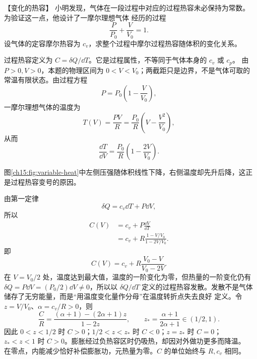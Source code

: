 {\begin{origexamplebox}{【变化的热容】}\label{ch15:ex:s29-20-3}
小明发现，气体在一段过程中对应的过程热容未必保持为常数。为验证这一点，他设计了一摩尔理想气体
经历的过程
\begin{equation*}
  \frac{P}{P_0}+\frac{V}{V_0}=1.
\end{equation*}
设气体的定容摩尔热容为 $c_v$，求整个过程中摩尔过程热容随体积的变化关系。

\ThQVariableCapacity
\end{origexamplebox}\par\nopagebreak[4]

\par\nopagebreak[4]\begin{xesolution}
过程热容定义为 $C=\delta Q/\dd T$。它是过程属性，不等同于气体本身的 $c_v$ 或 $c_p$。
由 $P>0,V>0$，本题的物理区间为 $0<V<V_0$；两截距只是边界，不是气体可取的常温有限状态。由过程方程
\begin{equation*}
  P=P_0\left(1-\frac{V}{V_0}\right),
\end{equation*}
一摩尔理想气体的温度为
\begin{equation*}
  T(V)=\frac{PV}{R}
  =\frac{P_0}{R}\left(V-\frac{V^2}{V_0}\right),
\end{equation*}
从而
\begin{equation*}
  \frac{\dd T}{\dd V}=\frac{P_0}{R}\left(1-\frac{2V}{V_0}\right).
\end{equation*}

\par\noindent\begin{minipage}{\linewidth}
\variableHeatCapacityDiagram
{}\label{ch15:fig:variable-heat}
\end{minipage}\par\medskip
图\ref{ch15:fig:variable-heat}中左侧压强随体积线性下降，右侧温度却先升后降，这正是过程热容变号的原因。

由第一定律
\begin{equation*}
  \delta Q=c_v\dd T+P\dd V,
\end{equation*}
所以
\begin{align*}
  C(V)
  &=c_v+P\frac{\dd V}{\dd T}\\
  &=c_v+R\frac{1-V/V_0}{1-2V/V_0}.
\end{align*}
即
\begin{equation}
  \boxed{C(V)=c_v+R\frac{V_0-V}{V_0-2V}}.
\end{equation}
在 $V=V_0/2$ 处，温度达到最大值，温度的一阶变化为零，但热量的一阶变化仍有
$\delta Q=P\dd V=(P_0/2)\dd V\ne0$，所以以 $\delta Q/\dd T$
定义的过程热容发散。发散不是气体储存了无穷能量，而是“用温度变化量作分母”在温度转折点失去良好
定义。令 $z=V/V_0$、$\alpha=c_v/R>0$，则
\[
 \frac{C}{R}=\frac{(\alpha+1)-(2\alpha+1)z}{1-2z},\qquad
 z_* =\frac{\alpha+1}{2\alpha+1}\in(1/2,1).
\]
因此 $0<z<1/2$ 时 $C>0$；$1/2<z<z_*$ 时 $C<0$；$z=z_*$ 时 $C=0$；
$z_*<z<1$ 时 $C>0$。膨胀经过负热容区时仍吸热，却因对外做功更多而降温。
在零点，内能减少恰好补偿膨胀功，元热量为零。$C$ 的单位始终与 $R,c_v$ 相同。
\end{xesolution}


}
